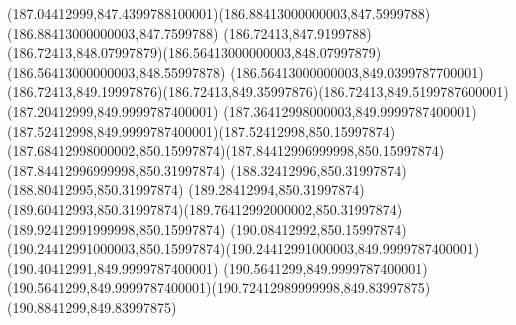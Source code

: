 {{	\curveto(187.04412999,847.4399788100001)(186.88413000000003,847.5999788)(186.88413000000003,847.7599788)
	\curveto(186.72413,847.9199788)(186.72413,848.07997879)(186.56413000000003,848.07997879)
	\lineto(186.56413000000003,848.55997878)
	\lineto(186.56413000000003,849.0399787700001)
	\curveto(186.72413,849.19997876)(186.72413,849.35997876)(186.72413,849.5199787600001)
	\lineto(187.20412999,849.9999787400001)
	\curveto(187.36412998000003,849.9999787400001)(187.52412998,849.9999787400001)(187.52412998,850.15997874)
	\curveto(187.68412998000002,850.15997874)(187.84412996999998,850.15997874)(187.84412996999998,850.31997874)
	\lineto(188.32412996,850.31997874)
	\lineto(188.80412995,850.31997874)
	\lineto(189.28412994,850.31997874)
	\curveto(189.60412993,850.31997874)(189.76412992000002,850.31997874)(189.92412991999998,850.15997874)
	\lineto(190.08412992,850.15997874)
	\curveto(190.24412991000003,850.15997874)(190.24412991000003,849.9999787400001)(190.40412991,849.9999787400001)
	\lineto(190.5641299,849.9999787400001)
	\curveto(190.5641299,849.9999787400001)(190.72412989999998,849.83997875)(190.8841299,849.83997875)
	\closepath
}
}


